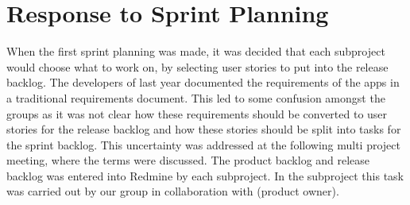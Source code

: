 \section{Response to Sprint Planning}\label{sec:s1p_response}
When the first sprint planning was made, it was decided that each subproject would choose what to work on, by selecting user stories to put into the release backlog. The developers of last year documented the requirements of the apps in a traditional requirements document. This led to some confusion amongst the groups as it was not clear how these requirements should be converted to user stories for the release backlog and how these stories should be split into tasks for the sprint backlog. This uncertainty was addressed at the following multi project meeting, where the terms were discussed. The product backlog and release backlog was entered into Redmine by each subproject. In the \bd subproject this task was carried out by our group in collaboration with  (\bd product owner).